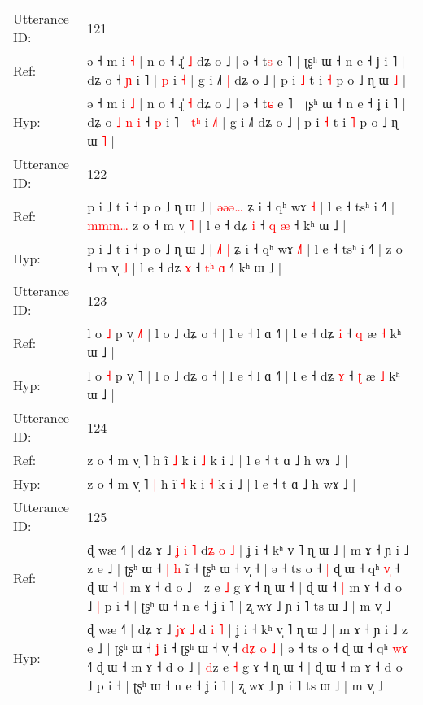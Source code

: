 \documentclass[10pt]{article}
\DeclareRobustCommand{\hl}[1]{{\textcolor{red}{#1}}}
\begin{document}
\begin{longtable}{ll}
 \\
\midrule
Utterance ID: & 121 \\
Ref: & ə ˧ m i \hl{˧} | n o ˧ ɻ̍ \hl{˩} dʑ o ˩ | ə ˧ t\hl{s} e ˥ | ʈʂʰ ɯ ˧ n e ˧ ʝ i ˥ | dʑ o\hl{}\hl{}\hl{}\hl{}\hl{}\hl{} ˧ \hl{ɲ} i ˥ | \hl{}\hl{p} i \hl{}\hl{˧} | g i ˩˥\hl{ }\hl{|} dʑ o ˩ | p i \hl{˩} t i \hl{˧} p o ˩ ɳ ɯ \hl{˩} |
 \\
Hyp: & ə ˧ m i \hl{˩} | n o ˧ ɻ̍ \hl{˧} dʑ o ˩ | ə ˧ t\hl{ɕ} e ˥ | ʈʂʰ ɯ ˧ n e ˧ ʝ i ˥ | dʑ o\hl{ }\hl{˩}\hl{ }\hl{n}\hl{ }\hl{i} ˧ \hl{p} i ˥ | \hl{t}\hl{ʰ} i \hl{˩}\hl{˥} | g i ˩˥\hl{}\hl{} dʑ o ˩ | p i \hl{˧} t i \hl{˥} p o ˩ ɳ ɯ \hl{˥} |
 \\
\midrule
Utterance ID: & 122 \\
Ref: & p i ˩ t i ˧ p o ˩ ɳ ɯ ˩ | \hl{ə}\hl{ə}\hl{ə}\hl{…} ʑ i ˧ qʰ wɤ \hl{}\hl{˧} | l e ˧ tsʰ i ˧˥ |\hl{ }\hl{m}\hl{m}\hl{m}\hl{…} z o ˧ m v̩ \hl{˥} | l e ˧ dʑ \hl{i} ˧ \hl{}\hl{q} \hl{æ} ˧\hl{} kʰ ɯ ˩ |
 \\
Hyp: & p i ˩ t i ˧ p o ˩ ɳ ɯ ˩ | \hl{˩}\hl{˥}\hl{ }\hl{|} ʑ i ˧ qʰ wɤ \hl{˩}\hl{˥} | l e ˧ tsʰ i ˧˥ |\hl{}\hl{}\hl{}\hl{}\hl{} z o ˧ m v̩ \hl{˩} | l e ˧ dʑ \hl{ɤ} ˧ \hl{t}\hl{ʰ} \hl{ɑ} ˧\hl{˥} kʰ ɯ ˩ |
 \\
\midrule
Utterance ID: & 123 \\
Ref: & l o \hl{˩} p v̩ \hl{˩}˥ | l o ˩ dʑ o ˧ | l e ˧ l ɑ ˧˥ | l e ˧ dʑ \hl{i} ˧ \hl{q} æ \hl{˧} kʰ ɯ ˩ |
 \\
Hyp: & l o \hl{˧} p v̩ \hl{}˥ | l o ˩ dʑ o ˧ | l e ˧ l ɑ ˧˥ | l e ˧ dʑ \hl{ɤ} ˧ \hl{ʈ} æ \hl{˩} kʰ ɯ ˩ |
 \\
\midrule
Utterance ID: & 124 \\
Ref: & z o ˧ m v̩ ˥\hl{}\hl{} h ĩ \hl{˩} k i \hl{˩} k i ˩ | l e ˧ t ɑ ˩ h wɤ ˩ |
 \\
Hyp: & z o ˧ m v̩ ˥\hl{ }\hl{|} h ĩ \hl{˧} k i \hl{˧} k i ˩ | l e ˧ t ɑ ˩ h wɤ ˩ |
 \\
\midrule
Utterance ID: & 125 \\
Ref: & ɖ wæ ˧˥ | dʑ ɤ ˩ \hl{ʝ}\hl{ }\hl{i} \hl{˥} d\hl{ʑ} \hl{o} \hl{˩} | ʝ i ˧ kʰ v̩ ˥ ɳ ɯ ˩ | m ɤ ˧ ɲ i ˩ z e ˩ | ʈʂʰ ɯ ˧\hl{ }\hl{|} \hl{h} i\hl{̃} ˧ ʈʂʰ ɯ ˧ v̩ ˧\hl{}\hl{}\hl{}\hl{}\hl{}\hl{}\hl{} | ə ˧ ts o ˧\hl{ }\hl{|} ɖ ɯ ˧ qʰ \hl{v}\hl{̩} ˧\hl{} ɖ ɯ ˧\hl{ }\hl{|} m ɤ ˧ d o ˩ | \hl{}z e \hl{˩} g ɤ ˧ ɳ ɯ ˧ | ɖ ɯ ˧\hl{ }\hl{|} m ɤ ˧ d o ˩\hl{ }\hl{|} p i ˧ | ʈʂʰ ɯ ˧ n e ˧ ʝ i ˥ | ʐ wɤ ˩ ɲ i ˥ ts ɯ ˩ | m v̩ ˩
 \\
Hyp: & ɖ wæ ˧˥ | dʑ ɤ ˩ \hl{}\hl{j}\hl{ɤ} \hl{˩} d\hl{} \hl{i} \hl{˥} | ʝ i ˧ kʰ v̩ ˥ ɳ ɯ ˩ | m ɤ ˧ ɲ i ˩ z e ˩ | ʈʂʰ ɯ ˧\hl{}\hl{} \hl{ʝ} i\hl{} ˧ ʈʂʰ ɯ ˧ v̩ ˧\hl{ }\hl{d}\hl{ʑ}\hl{ }\hl{o}\hl{ }\hl{˩} | ə ˧ ts o ˧\hl{}\hl{} ɖ ɯ ˧ qʰ \hl{w}\hl{ɤ} ˧\hl{˥} ɖ ɯ ˧\hl{}\hl{} m ɤ ˧ d o ˩ | \hl{d}z e \hl{˧} g ɤ ˧ ɳ ɯ ˧ | ɖ ɯ ˧\hl{}\hl{} m ɤ ˧ d o ˩\hl{}\hl{} p i ˧ | ʈʂʰ ɯ ˧ n e ˧ ʝ i ˥ | ʐ wɤ ˩ ɲ i ˥ ts ɯ ˩ | m v̩ ˩

\end{longtable}
\end{document}
